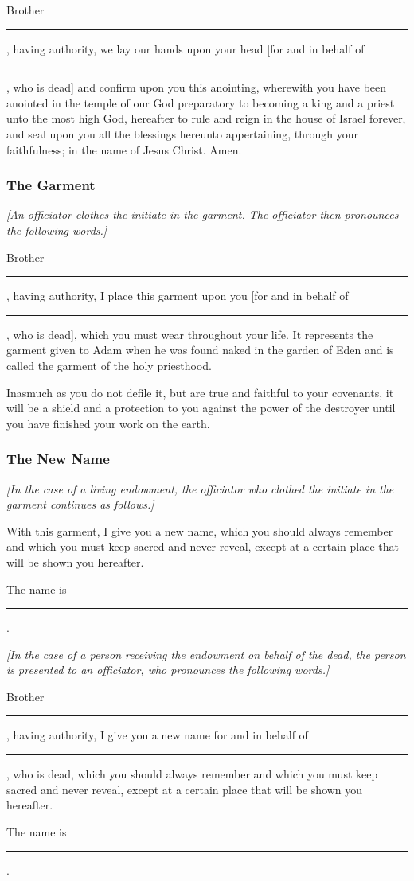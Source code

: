 			Brother \rule{1cm}{0.15mm}, having authority, we lay our hands upon your head [for and in behalf of \rule{1cm}{0.15mm}, who is dead] and confirm upon you this anointing, wherewith you have been anointed in the temple of our God preparatory to becoming a king and a priest unto the most high God, hereafter to rule and reign in the house of Israel forever, and seal upon you all the blessings hereunto appertaining, through your faithfulness; in the name of Jesus Christ. Amen.
			
		\subsubsection{The Garment}
			\label{TEMPLE-ENDOWMENT-INIT-PRE-2005-GARMENT}
		
			\textit{[An officiator clothes the initiate in the garment. The officiator then pronounces the following words.]}
			
			Brother \rule{1cm}{0.15mm}, having authority, I place this garment upon you [for and in behalf of \rule{1cm}{0.15mm}, who is dead], which you must wear throughout your life. It represents the garment given to Adam when he was found naked in the garden of Eden and is called the garment of the holy priesthood.
			
			Inasmuch as you do not defile it, but are true and faithful to your covenants, it will be a shield and a protection to you against the power of the destroyer until you have finished your work on the earth.
			
		\subsubsection{The New Name}
			\label{TEMPLE-ENDOWMENT-INIT-PRE-2005-NAME}
		
			\textit{[In the case of a living endowment, the officiator who clothed the initiate in the garment continues as follows.]}
			
			With this garment, I give you a new name, which you should always remember and which you must keep sacred and never reveal, except at a certain place that will be shown you hereafter.
			
			The name is \rule{1cm}{0.15mm}.
			
			\textit{[In the case of a person receiving the endowment on behalf of the dead, the person is presented to an officiator, who pronounces the following words.]}
			
			Brother \rule{1cm}{0.15mm}, having authority, I give you a new name for and in behalf of \rule{1cm}{0.15mm}, who is dead, which you should always remember and which you must keep sacred and never reveal, except at a certain place that will be shown you hereafter.

			The name is \rule{1cm}{0.15mm}.